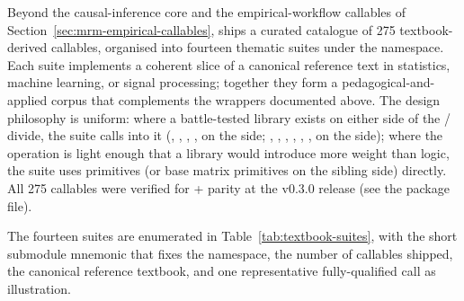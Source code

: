 \documentclass[article,shortnames,nojss]{jss}
\begin{document}
Beyond the causal-inference core and the empirical-workflow
callables of Section~\ref{sec:mrm-empirical-callables},
 ships a curated catalogue of 275 textbook-derived
callables, organised into fourteen thematic suites under the
 namespace.  Each suite implements a coherent
slice of a canonical reference text in statistics, machine
learning, or signal processing; together they form a
pedagogical-and-applied corpus that complements the wrappers
documented above.  The design philosophy is uniform: where a
battle-tested library exists on either side of the
/ divide, the suite calls into it
(, , ,
,  on the  side;
, , , ,
, ,  on the
 side); where the operation is light enough that a
library would introduce more weight than logic, the suite uses
 primitives (or base  matrix
primitives on the sibling side) directly.  All 275 callables
were verified for  +  parity at the
v0.3.0 release (see the package  file).

The fourteen suites are enumerated in
Table~\ref{tab:textbook-suites}, with the short submodule
mnemonic that fixes the namespace, the number of callables
shipped, the canonical reference textbook, and one representative
fully-qualified  call as illustration.
\end{document}
